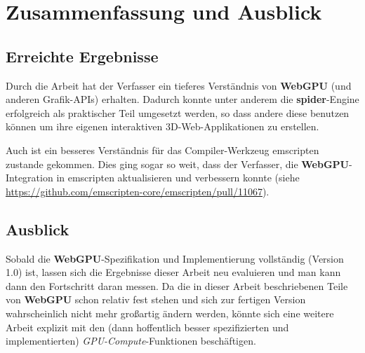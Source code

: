 \documentclass[oneside]{ausarbeitung}
\newcommand*{\quotize}[1]{\glqq #1\grqq}
\begin{document}
\chapter{Zusammenfassung und Ausblick}
\label{cha:zusammenfassung}

\section{Erreichte Ergebnisse}
\label{sec:ergebnisse}
Durch die Arbeit hat der Verfasser ein tieferes Verständnis von \textbf{WebGPU} (und anderen Grafik-APIs) erhalten. Dadurch konnte unter anderem die \textbf{spider}-Engine erfolgreich als praktischer Teil umgesetzt werden, so dass andere diese benutzen können um ihre eigenen interaktiven 3D-Web-Applikationen zu erstellen. 

Auch ist ein besseres Verständnis für das Compiler-Werkzeug emscripten zustande gekommen. Dies ging sogar so weit, dass der Verfasser, die \textbf{WebGPU}-Integration in emscripten aktualisieren und verbessern konnte (siehe \url{https://github.com/emscripten-core/emscripten/pull/11067}).

\section{Ausblick}
\label{sec:ausblick}

Sobald die \textbf{WebGPU}-Spezifikation und Implementierung vollständig (Version 1.0) ist, lassen sich die Ergebnisse dieser Arbeit neu evaluieren und man kann dann den Fortschritt daran messen. Da die in dieser Arbeit beschriebenen Teile von \textbf{WebGPU} schon relativ fest stehen und sich zur \quotize{fertigen} Version wahrscheinlich nicht mehr großartig ändern werden, könnte sich eine weitere Arbeit explizit mit den (dann hoffentlich besser spezifizierten und implementierten) \textit{GPU-Compute}-Funktionen beschäftigen.

\printbibliography[title={Referenzen}]

\appendix

\end{document}
